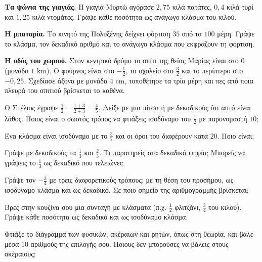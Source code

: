\ex \textbf{Τα ψώνια της γιαγιάς.} Η γιαγιά Μυρτώ αγόρασε $2{,}75$ κιλά πατάτες, $0{,}4$ κιλά τυρί και $1{,}25$ κιλά ντομάτες. Γράψε κάθε ποσότητα ως ανάγωγο κλάσμα του κιλού.

\ex \textbf{Η μπαταρία.} Το κινητό της Πολυξένης δείχνει φόρτιση $35$ από τα $100$ μέρη. Γράψε το κλάσμα, τον δεκαδικό αριθμό και το ανάγωγο κλάσμα που εκφράζουν τη φόρτιση.

\ex \textbf{Η οδός του χωριού.} Στον κεντρικό δρόμο το σπίτι της θείας Μαρίας είναι στο $0$ (μονάδα $1$ km). Ο φούρνος είναι στο $-\frac{1}{2}$, το σχολείο στο $\frac{3}{2}$ και το περίπτερο στο $-0{,}25$. Σχεδίασε άξονα με μονάδα $4$ cm, τοποθέτησε τα τρία μέρη και πες από ποια πλευρά του σπιτιού βρίσκεται το καθένα.


\ex Ο Στέλιος έγραψε $\frac{1}{2}=\frac{1+3}{2+3}=\frac{4}{5}$. Δείξε με μια πίτσα ή με δεκαδικούς ότι αυτό είναι λάθος. Ποιος είναι ο σωστός τρόπος να φτιάξεις ισοδύναμο του $\frac{1}{2}$ με παρονομαστή $10$;

\ex Ένα κλάσμα είναι ισοδύναμο με το $\frac{3}{7}$ και οι όροι του διαφέρουν κατά $20$. Ποιο είναι;

\ex Γράψε με δεκαδικούς τα $\frac{1}{3}$ και $\frac{2}{3}$. Τι παρατηρείς στα δεκαδικά ψηφία; Μπορείς να γράψεις το $\frac{1}{3}$ ως δεκαδικό που τελειώνει;

\ex Γράψε τον $-\frac{3}{4}$ με τρεις διαφορετικούς τρόπους: με τη θέση του προσήμου, ως ισοδύναμο κλάσμα και ως δεκαδικό. Σε ποιο σημείο της αριθμογραμμής βρίσκεται;


\ex Βρες στην κουζίνα σου μια συνταγή με κλάσματα (π.χ. $\frac{1}{2}$ φλιτζάνι, $\frac{3}{4}$ του κιλού). Γράψε κάθε ποσότητα ως δεκαδικό και ως ισοδύναμο κλάσμα.

\ex Φτιάξε το διάγραμμα των φυσικών, ακέραιων και ρητών, όπως στη θεωρία, και βάλε μέσα $10$ αριθμούς της επιλογής σου. Ποιους δεν μπορούσες να βάλεις στους ακέραιους;
